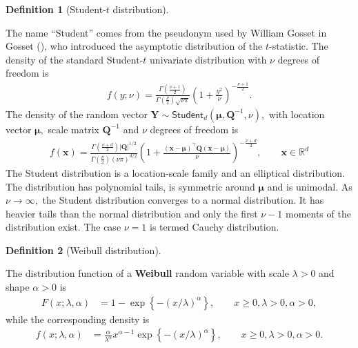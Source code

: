 \documentclass[
  11pt,
  letterpaper,
]{scrbook}
\theoremstyle{definition}
\newtheorem{definition}{Definition}[chapter]
\theoremstyle{plain}
\theoremstyle{plain}
\theoremstyle{definition}
\theoremstyle{definition}
\theoremstyle{remark}
\begin{document}
\begin{definition}[Student-\(t\)
distribution]\protect\hypertarget{def-student-dist}{}\label{def-student-dist}

The name ``Student'' comes from the pseudonym used by William Gosset in
Gosset (), who introduced the
asymptotic distribution of the \(t\)-statistic. The density of the
standard Student-\(t\) univariate distribution with \(\nu\) degrees of
freedom is \begin{align*}
f(y; \nu) = \frac{\Gamma \left( \frac{\nu+1}{2}\right)}{\Gamma\left(\frac{\nu}{2}\right)
\sqrt{\nu\pi}}\left(1+\frac{y^{2}}{\nu}\right)^{-\frac{\nu+1}{2}}.
\end{align*} The density of the random vector
\(\boldsymbol{Y} \sim \mathsf{Student}_d(\boldsymbol{\mu}, \boldsymbol{Q}^{-1}, \nu),\)
with location vector \(\boldsymbol{\mu},\) scale matrix
\(\boldsymbol{Q}^{-1}\) and \(\nu\) degrees of freedom is \begin{align*}
f(\boldsymbol{x}) = \frac{\Gamma \left( \frac{\nu+d}{2}\right)|\boldsymbol{Q}|^{1/2}}{\Gamma\left(\frac{\nu}{2}\right)
(\nu\pi)^{d/2}}\left(1+\frac{(\boldsymbol{x}-\boldsymbol{\mu})^\top\boldsymbol{Q}(\boldsymbol{x}-\boldsymbol{\mu})}{\nu} \right)^{-\frac{\nu+d}{2}}, \qquad \boldsymbol{x} \in \mathbb{R}^d
\end{align*} The Student distribution is a location-scale family and an
elliptical distribution. The distribution has polynomial tails, is
symmetric around \(\boldsymbol{\mu}\) and is unimodal. As
\(\nu \to \infty,\) the Student distribution converges to a normal
distribution. It has heavier tails than the normal distribution and only
the first \(\nu-1\) moments of the distribution exist. The case
\(\nu=1\) is termed Cauchy distribution.

\end{definition}

\begin{definition}[Weibull
distribution]\protect\hypertarget{def-weibull}{}\label{def-weibull}

The distribution function of a \textbf{Weibull} random variable with
scale \(\lambda>0\) and shape \(\alpha>0\) is \begin{align*}
F(x; \lambda, \alpha) &= 1 - \exp\left\{-(x/\lambda)^\alpha\right\}, \qquad x \geq 0, \lambda>0, \alpha>0,
\end{align*} while the corresponding density is \begin{align*}
f(x; \lambda, \alpha) &= \frac{\alpha}{\lambda^\alpha} x^{\alpha-1}\exp\left\{-(x/\lambda)^\alpha\right\}, \qquad x \geq 0, \lambda>0, \alpha>0.
\end{align*}

\end{definition}
\end{document}
